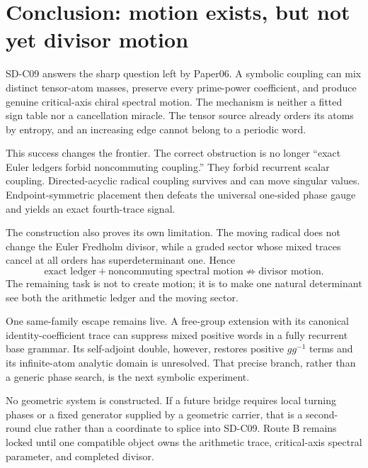 \section{Conclusion: motion exists, but not yet divisor motion}
\label{sec:conclusion}

SD-C09 answers the sharp question left by Paper06.  A symbolic coupling can
mix distinct tensor-atom masses, preserve every prime-power coefficient, and
produce genuine critical-axis chiral spectral motion.  The mechanism is
neither a fitted sign table nor a cancellation miracle.  The tensor source
already orders its atoms by entropy, and an increasing edge cannot belong to
a periodic word.

This success changes the frontier.  The correct obstruction is no longer
``exact Euler ledgers forbid noncommuting coupling.''  They forbid recurrent
scalar coupling.  Directed-acyclic radical coupling survives and can move
singular values.  Endpoint-symmetric placement then defeats the universal
one-sided phase gauge and yields an exact fourth-trace signal.

The construction also proves its own limitation.  The moving radical does
not change the Euler Fredholm divisor, while a graded sector whose mixed
traces cancel at all orders has superdeterminant one.  Hence
\[
 \boxed{
 \text{exact ledger}+\text{noncommuting spectral motion}
 \not\Rightarrow \text{divisor motion}.}
\]
The remaining task is not to create motion; it is to make one natural
determinant see both the arithmetic ledger and the moving sector.

One same-family escape remains live.  A free-group extension with its
canonical identity-coefficient trace can suppress mixed positive words in a
fully recurrent base grammar.  Its self-adjoint double, however, restores
positive $gg^{-1}$ terms and its infinite-atom analytic domain is unresolved.
That precise branch, rather than a generic phase search, is the next
symbolic experiment.

No geometric system is constructed.  If a future bridge requires local
turning phases or a fixed generator supplied by a geometric carrier, that is
a second-round clue rather than a coordinate to splice into SD-C09.  Route B
remains locked until one compatible object owns the arithmetic trace,
critical-axis spectral parameter, and completed divisor.
